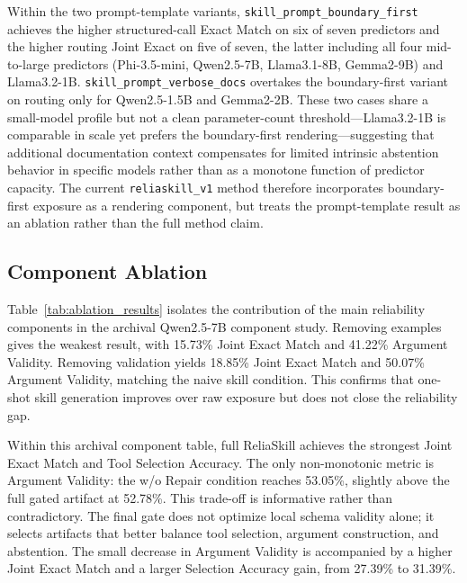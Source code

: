 \documentclass[11pt]{article}
\newcommand{\method}{ReliaSkill}
\begin{document}
Within the two prompt-template variants, \texttt{skill\_prompt\_boundary\_first} achieves the higher structured-call Exact Match on six of seven predictors and the higher routing Joint Exact on five of seven, the latter including all four mid-to-large predictors (Phi-3.5-mini, Qwen2.5-7B, Llama3.1-8B, Gemma2-9B) and Llama3.2-1B. \texttt{skill\_prompt\_verbose\_docs} overtakes the boundary-first variant on routing only for Qwen2.5-1.5B and Gemma2-2B. These two cases share a small-model profile but not a clean parameter-count threshold---Llama3.2-1B is comparable in scale yet prefers the boundary-first rendering---suggesting that additional documentation context compensates for limited intrinsic abstention behavior in specific models rather than as a monotone function of predictor capacity. The current \texttt{reliaskill\_v1} method therefore incorporates boundary-first exposure as a rendering component, but treats the prompt-template result as an ablation rather than the full method claim.

\subsection{Component Ablation}
\label{subsec:component_ablation_results}

Table~\ref{tab:ablation_results} isolates the contribution of the main reliability components in the archival Qwen2.5-7B component study. Removing examples gives the weakest result, with 15.73\% Joint Exact Match and 41.22\% Argument Validity. Removing validation yields 18.85\% Joint Exact Match and 50.07\% Argument Validity, matching the naive skill condition. This confirms that one-shot skill generation improves over raw exposure but does not close the reliability gap.

Within this archival component table, full \method{} achieves the strongest Joint Exact Match and Tool Selection Accuracy. The only non-monotonic metric is Argument Validity: the w/o Repair condition reaches 53.05\%, slightly above the full gated artifact at 52.78\%. This trade-off is informative rather than contradictory. The final gate does not optimize local schema validity alone; it selects artifacts that better balance tool selection, argument construction, and abstention. The small decrease in Argument Validity is accompanied by a higher Joint Exact Match and a larger Selection Accuracy gain, from 27.39\% to 31.39\%.
\end{document}

